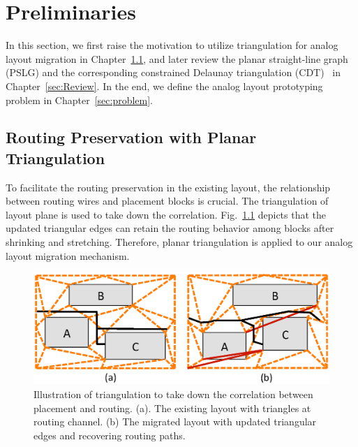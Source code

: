 
\chapter{Preliminaries}\label{chap:prelim}

  \newtheorem{defi}{Definition}

  In this section, we first raise the motivation to utilize triangulation for analog layout migration in Chapter~\ref{sec:WhyCDT}, and later review the planar straight-line graph (PSLG) and the corresponding constrained Delaunay triangulation (CDT)~\cite{CDT} in Chapter~\ref{sec:Review}. In the end, we define the analog layout prototyping problem in Chapter~\ref{sec:problem}.

  \section{Routing Preservation with Planar Triangulation}\label{sec:WhyCDT}

    To facilitate the routing preservation in the existing layout, the relationship between routing wires and placement blocks is crucial. The triangulation of layout plane is used to take down the correlation. Fig.~\ref{fig:WhyCDT} depicts that the updated triangular edges can retain the routing behavior among blocks after shrinking and stretching. Therefore, planar triangulation is applied to our analog layout migration mechanism.

    \begin{figure}[ht]
      \begin{center}
        \includegraphics[width=\textwidth]{Fig/WhyCDT.eps}
        \caption{Illustration of triangulation to take down the correlation between placement and routing. (a). The existing layout with triangles at routing channel. (b) The migrated layout with updated triangular edges and recovering routing paths.}
        \label{fig:WhyCDT}
      \end{center}
    \end{figure}